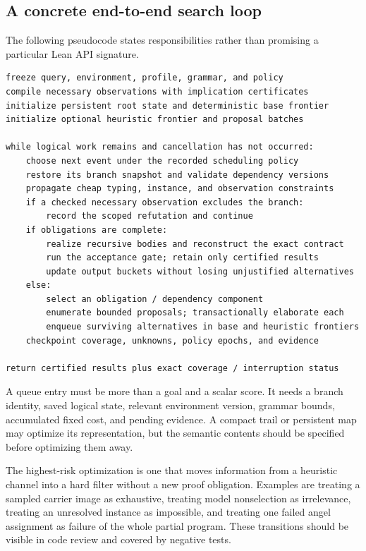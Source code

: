 \documentclass[11pt,a4paper]{article}
\theoremstyle{definition}
\theoremstyle{remark}
\begin{document}
\Needspace{135mm}
\subsection{A concrete end-to-end search loop}

The following pseudocode states responsibilities rather than promising a particular Lean API signature.

\par\noindent\begin{minipage}{\linewidth}
\begin{lstlisting}[basicstyle=\footnotesize\ttfamily]
freeze query, environment, profile, grammar, and policy
compile necessary observations with implication certificates
initialize persistent root state and deterministic base frontier
initialize optional heuristic frontier and proposal batches

while logical work remains and cancellation has not occurred:
    choose next event under the recorded scheduling policy
    restore its branch snapshot and validate dependency versions
    propagate cheap typing, instance, and observation constraints
    if a checked necessary observation excludes the branch:
        record the scoped refutation and continue
    if obligations are complete:
        realize recursive bodies and reconstruct the exact contract
        run the acceptance gate; retain only certified results
        update output buckets without losing unjustified alternatives
    else:
        select an obligation / dependency component
        enumerate bounded proposals; transactionally elaborate each
        enqueue surviving alternatives in base and heuristic frontiers
    checkpoint coverage, unknowns, policy epochs, and evidence

return certified results plus exact coverage / interruption status
\end{lstlisting}
\end{minipage}\par

A queue entry must be more than a goal and a scalar score. It needs a branch identity, saved logical state, relevant environment version, grammar bounds, accumulated fixed cost, and pending evidence. A compact trail or persistent map may optimize its representation, but the semantic contents should be specified before optimizing them away.

The highest-risk optimization is one that moves information from a heuristic channel into a hard filter without a new proof obligation. Examples are treating a sampled carrier image as exhaustive, treating model nonselection as irrelevance, treating an unresolved instance as impossible, and treating one failed angel assignment as failure of the whole partial program. These transitions should be visible in code review and covered by negative tests.
\end{document}
